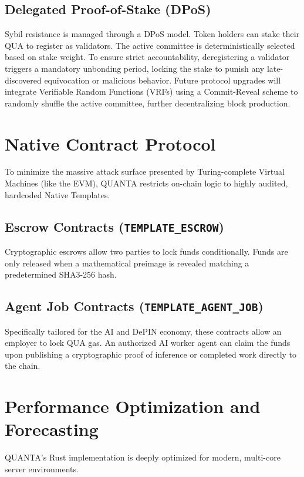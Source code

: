 \documentclass[11pt,a4paper]{article}
\begin{document}
\subsection{Delegated Proof-of-Stake (DPoS)}
Sybil resistance is managed through a DPoS model. Token holders can stake their QUA to register as validators. The active committee is deterministically selected based on stake weight. To ensure strict accountability, deregistering a validator triggers a mandatory unbonding period, locking the stake to punish any late-discovered equivocation or malicious behavior. Future protocol upgrades will integrate Verifiable Random Functions (VRFs) using a Commit-Reveal scheme to randomly shuffle the active committee, further decentralizing block production.

\section{Native Contract Protocol}
To minimize the massive attack surface presented by Turing-complete Virtual Machines (like the EVM), QUANTA restricts on-chain logic to highly audited, hardcoded Native Templates.

\subsection{Escrow Contracts (\texttt{TEMPLATE\_ESCROW})}
Cryptographic escrows allow two parties to lock funds conditionally. Funds are only released when a mathematical preimage is revealed matching a predetermined SHA3-256 hash.

\subsection{Agent Job Contracts (\texttt{TEMPLATE\_AGENT\_JOB})}
Specifically tailored for the AI and DePIN economy, these contracts allow an employer to lock QUA gas. An authorized AI worker agent can claim the funds upon publishing a cryptographic proof of inference or completed work directly to the chain.

\section{Performance Optimization and Forecasting}
QUANTA's Rust implementation is deeply optimized for modern, multi-core server environments.
\end{document}
